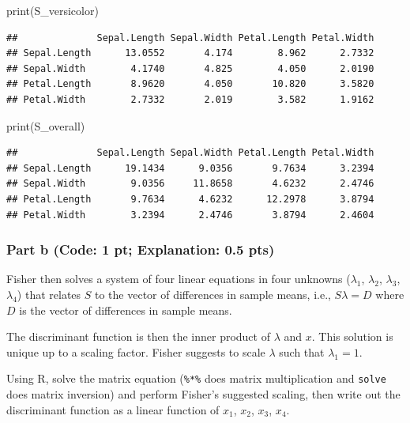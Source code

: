 \documentclass[
]{article}
\newenvironment{Shaded}{\begin{snugshade}}{\end{snugshade}}
\newcommand{\FunctionTok}[1]{\textcolor[rgb]{0.00,0.00,0.00}{#1}}
\newcommand{\NormalTok}[1]{#1}
\begin{document}
\begin{Shaded}
\begin{Highlighting}[]
\FunctionTok{print}\NormalTok{(S\_versicolor) }
\end{Highlighting}
\end{Shaded}

\begin{verbatim}
##              Sepal.Length Sepal.Width Petal.Length Petal.Width
## Sepal.Length      13.0552       4.174        8.962      2.7332
## Sepal.Width        4.1740       4.825        4.050      2.0190
## Petal.Length       8.9620       4.050       10.820      3.5820
## Petal.Width        2.7332       2.019        3.582      1.9162
\end{verbatim}

\begin{Shaded}
\begin{Highlighting}[]
\FunctionTok{print}\NormalTok{(S\_overall)}
\end{Highlighting}
\end{Shaded}

\begin{verbatim}
##              Sepal.Length Sepal.Width Petal.Length Petal.Width
## Sepal.Length      19.1434      9.0356       9.7634      3.2394
## Sepal.Width        9.0356     11.8658       4.6232      2.4746
## Petal.Length       9.7634      4.6232      12.2978      3.8794
## Petal.Width        3.2394      2.4746       3.8794      2.4604
\end{verbatim}

\hypertarget{part-b-code-1-pt-explanation-0.5-pts}{%
\subsubsection{Part b (Code: 1 pt; Explanation: 0.5
pts)}\label{part-b-code-1-pt-explanation-0.5-pts}}

Fisher then solves a system of four linear equations in four unknowns
(\(\lambda_1\), \(\lambda_2\), \(\lambda_3\), \(\lambda_4\)) that
relates \(S\) to the vector of differences in sample means, i.e.,
\(S \lambda = D\) where \(D\) is the vector of differences in sample
means.

The discriminant function is then the inner product of \(\lambda\) and
\(x\). This solution is unique up to a scaling factor. Fisher suggests
to scale \(\lambda\) such that \(\lambda_1 = 1\).

Using R, solve the matrix equation (\texttt{\%*\%} does matrix
multiplication and \texttt{solve} does matrix inversion) and perform
Fisher's suggested scaling, then write out the discriminant function as
a linear function of \(x_1\), \(x_2\), \(x_3\), \(x_4\).
\end{document}
